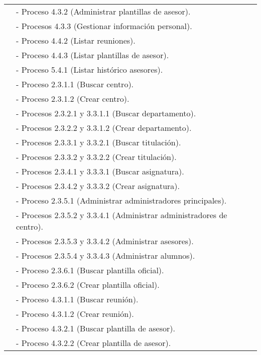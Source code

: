\begin{center}
\begin{longtable}{| l | p{9cm} |}
                         & - Proceso 4.3.2 (Administrar plantillas de asesor).\\
                         & - Procesos 4.3.3 (Gestionar información personal).\\
                         & - Proceso 4.4.2 (Listar reuniones).\\
                         & - Proceso 4.4.3 (Listar plantillas de asesor).\\
                         & - Proceso 5.4.1 (Listar histórico asesores).\\
                         & - Proceso 2.3.1.1 (Buscar centro).\\
                         & - Proceso 2.3.1.2 (Crear centro).\\
                         & - Procesos 2.3.2.1 y 3.3.1.1 (Buscar departamento).\\
                         & - Procesos 2.3.2.2 y 3.3.1.2 (Crear departamento).\\
                         & - Procesos 2.3.3.1 y 3.3.2.1 (Buscar titulación).\\
                         & - Procesos 2.3.3.2 y 3.3.2.2 (Crear titulación).\\
                         & - Procesos 2.3.4.1 y 3.3.3.1 (Buscar asignatura).\\
                         & - Procesos 2.3.4.2 y 3.3.3.2 (Crear asignatura).\\
                         & - Proceso 2.3.5.1 (Administrar administradores principales).\\
                         & - Procesos 2.3.5.2 y 3.3.4.1 (Administrar administradores de centro).\\
                         & - Procesos 2.3.5.3 y 3.3.4.2 (Administrar asesores).\\
                         & - Procesos 2.3.5.4 y 3.3.4.3 (Administrar alumnos).\\
                         & - Proceso 2.3.6.1 (Buscar plantilla oficial).\\
                         & - Proceso 2.3.6.2 (Crear plantilla oficial).\\
                         & - Proceso 4.3.1.1 (Buscar reunión).\\
                         & - Proceso 4.3.1.2 (Crear reunión).\\
                         & - Proceso 4.3.2.1 (Buscar plantilla de asesor).\\
                         & - Proceso 4.3.2.2 (Crear plantilla de asesor).\\

\end{longtable}
\end{center}
